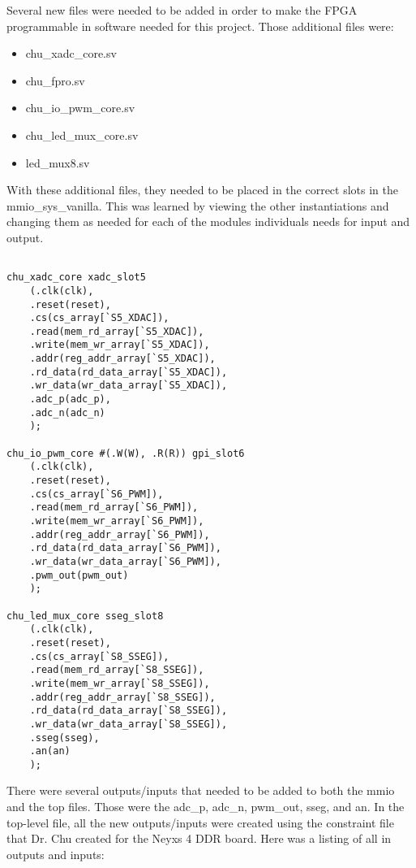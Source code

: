 \documentclass[11pt]{article}
\begin{document}
\quad Several new files were needed to be added in order to make the FPGA programmable in software needed for this project. Those additional files were: 

\begin{multicols}{2}
\begin{itemize}
	\item chu\_xadc\_core.sv
	\item chu\_fpro.sv
	\item chu\_io\_pwm\_core.sv
	\item chu\_led\_mux\_core.sv
	\item led\_mux8.sv 
\end{itemize}
\end{multicols}

\quad With these additional files, they needed to be placed in the correct slots in the mmio\_sys\_vanilla. This was learned by viewing the other instantiations and changing them as needed for each of the modules individuals needs for input and output. 

\begin{lstlisting}[style=Verilog,caption= Slot Instantiations,label=code:ex ]

chu_xadc_core xadc_slot5
	(.clk(clk),
	.reset(reset),
	.cs(cs_array[`S5_XDAC]),
	.read(mem_rd_array[`S5_XDAC]),
	.write(mem_wr_array[`S5_XDAC]),
	.addr(reg_addr_array[`S5_XDAC]),
	.rd_data(rd_data_array[`S5_XDAC]),
	.wr_data(wr_data_array[`S5_XDAC]),
	.adc_p(adc_p), 
	.adc_n(adc_n)
	);

chu_io_pwm_core #(.W(W), .R(R)) gpi_slot6 
	(.clk(clk),
	.reset(reset),
	.cs(cs_array[`S6_PWM]),
	.read(mem_rd_array[`S6_PWM]),
	.write(mem_wr_array[`S6_PWM]),
	.addr(reg_addr_array[`S6_PWM]),
	.rd_data(rd_data_array[`S6_PWM]),
	.wr_data(wr_data_array[`S6_PWM]),
	.pwm_out(pwm_out)
	);

chu_led_mux_core sseg_slot8
	(.clk(clk),
	.reset(reset),
	.cs(cs_array[`S8_SSEG]),
	.read(mem_rd_array[`S8_SSEG]),
	.write(mem_wr_array[`S8_SSEG]),
	.addr(reg_addr_array[`S8_SSEG]),
	.rd_data(rd_data_array[`S8_SSEG]),
	.wr_data(wr_data_array[`S8_SSEG]),
	.sseg(sseg), 
	.an(an)
	);

\end{lstlisting}

\newpage
\quad There were several outputs/inputs that needed to be added to both the mmio and the top files. Those were the adc\_p, adc\_n, pwm\_out, sseg, and an. In the top-level file, all the new outputs/inputs were created using the constraint file that Dr. Chu created for the Neyxs 4 DDR board. Here was a listing of all in outputs and inputs: 
\end{document}
